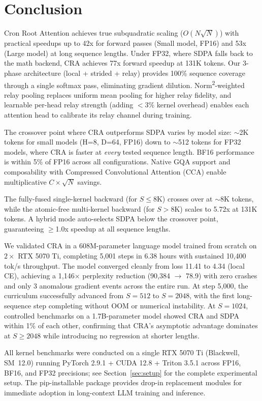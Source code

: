\documentclass{article}
\begin{document}
    \section{Conclusion}

    Cron Root Attention achieves true subquadratic scaling ($O(N\sqrt{N})$) with practical speedups up to 42x for forward passes (Small model, FP16) and 53x (Large model) at long sequence lengths. Under FP32, where SDPA falls back to the math backend, CRA achieves 77x forward speedup at 131K tokens. Our 3-phase architecture (local + strided + relay) provides 100\% sequence coverage through a single softmax pass, eliminating gradient dilution. Norm\textsuperscript{2}-weighted relay pooling replaces uniform mean pooling for higher relay fidelity, and learnable per-head relay strength (adding $<$3\% kernel overhead) enables each attention head to calibrate its relay channel during training.

    The crossover point where CRA outperforms SDPA varies by model size: $\sim$2K tokens for small models (H=8, D=64, FP16) down to $\sim$512 tokens for FP32 models, where CRA is faster at \emph{every} tested sequence length. BF16 performance is within 5\% of FP16 across all configurations. Native GQA support and composability with Compressed Convolutional Attention (CCA) enable multiplicative $C \times \sqrt{N}$ savings.

    The fully-fused single-kernel backward (for $S \leq 8$K) crosses over at $\sim$8K tokens, while the atomic-free multi-kernel backward (for $S > 8$K) scales to 5.72x at 131K tokens. A hybrid mode auto-selects SDPA below the crossover point, guaranteeing $\geq$1.0x speedup at all sequence lengths.

    We validated CRA in a 608M-parameter language model trained from scratch on $2\times$ RTX 5070 Ti, completing 5,001 steps in 6.38 hours with sustained 10,400 tok/s throughput. The model converged cleanly from loss 11.41 to 4.34 (local CE), achieving a 1,146$\times$ perplexity reduction (90,384 $\to$ 78.9) with zero crashes and only 3 anomalous gradient events across the entire run. At step 5,000, the curriculum successfully advanced from $S{=}512$ to $S{=}2048$, with the first long-sequence step completing without OOM or numerical instability. At $S=1024$, controlled benchmarks on a 1.7B-parameter model showed CRA and SDPA within 1\% of each other, confirming that CRA's asymptotic advantage dominates at $S \geq 2048$ while introducing no regression at shorter lengths.

    All kernel benchmarks were conducted on a single RTX 5070 Ti (Blackwell, SM~12.0) running PyTorch 2.9.1 + CUDA 12.8 + Triton 3.5.1 across FP16, BF16, and FP32 precisions; see Section~\ref{sec:setup} for the complete experimental setup. The pip-installable package provides drop-in replacement modules for immediate adoption in long-context LLM training and inference.
\end{document}
